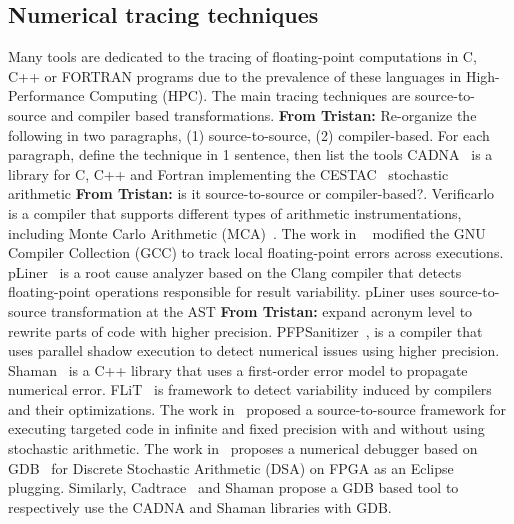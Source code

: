\documentclass[11pt]{article}
\newcommand{\tristan}[1]{\color{orange}\textbf{From Tristan:} #1\color{black}\xspace}
\newcommand{\pytracer}[0]{PyTracer\xspace}
\begin{document}

\label{sec:soa}
\subsection{Numerical tracing techniques}

Many tools  are dedicated to the tracing of floating-point computations in C, C++ or FORTRAN programs due to the prevalence of these languages in High-Performance Computing (HPC). 
The main tracing techniques are source-to-source and compiler based transformations. \tristan{Re-organize the following in two paragraphs, (1) source-to-source, (2) compiler-based. For each paragraph, define the technique in 1 sentence, then list the tools} 
CADNA~\cite{jezequel2008cadna} is a library for C, C++ and Fortran  implementing the
CESTAC~\cite{vignes1993stochastic} stochastic arithmetic \tristan{is it source-to-source or compiler-based?}.
Verificarlo~\cite{verificarlo} is a compiler that supports different types of arithmetic instrumentations, including
Monte Carlo Arithmetic (MCA)~\cite{parker1997monte}. The work in ~\cite{bao2013fly} modified the GNU Compiler Collection (GCC) to track local floating-point errors across executions. pLiner~\cite{guo2020pliner} is a root cause analyzer based on the Clang compiler that detects floating-point operations 
responsible for result variability. 
pLiner uses source-to-source transformation at the AST \tristan{expand acronym} level  to rewrite parts of code with higher precision. PFPSanitizer~\cite{chowdhary2020debugging,chowdhary2021parallel}, is a compiler that uses parallel shadow execution to detect numerical issues using higher precision.
Shaman~\cite{demeure_phd} is a C++ library that uses a first-order error model to propagate numerical error. 
FLiT~\cite{sawaya2017flit} is framework to detect variability induced by compilers and their optimizations.
The work in~\cite{tang2016software} proposed a source-to-source framework for executing targeted code 
in infinite and fixed precision with and without using stochastic arithmetic.
The work in~\cite{wang2012development} proposes a numerical debugger based on GDB~\cite{stallman1988debugging} for 
Discrete Stochastic Arithmetic (DSA) on FPGA as an Eclipse plugging. Similarly, Cadtrace~\cite{jezequel2008cadna}
and Shaman propose a GDB based tool to respectively use the CADNA and Shaman libraries with GDB.
\end{document}
